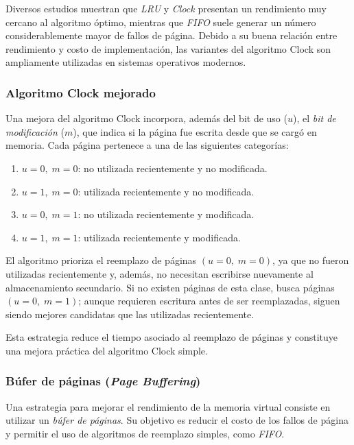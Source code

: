 Diversos estudios muestran que \textit{LRU} y \textit{Clock} presentan un rendimiento muy cercano al algoritmo óptimo, mientras que \textit{FIFO} suele generar un número considerablemente mayor de fallos de página. Debido a su buena relación entre rendimiento y costo de implementación, las variantes del algoritmo Clock son ampliamente utilizadas en sistemas operativos modernos.

\subsubsection{Algoritmo Clock mejorado}

Una mejora del algoritmo Clock incorpora, además del bit de uso (\(u\)), el \textit{bit de modificación} (\(m\)), que indica si la página fue escrita desde que se cargó en memoria. Cada página pertenece a una de las siguientes categorías:

\begin{enumerate}
  \item \(u=0,\; m=0\): no utilizada recientemente y no modificada.
  \item \(u=1,\; m=0\): utilizada recientemente y no modificada.
  \item \(u=0,\; m=1\): no utilizada recientemente y modificada.
  \item \(u=1,\; m=1\): utilizada recientemente y modificada.
\end{enumerate}

El algoritmo prioriza el reemplazo de páginas \((u=0,\; m=0)\), ya que no fueron utilizadas recientemente y, además, no necesitan escribirse nuevamente al almacenamiento secundario. Si no existen páginas de esta clase, busca páginas \((u=0,\; m=1)\); aunque requieren escritura antes de ser reemplazadas, siguen siendo mejores candidatas que las utilizadas recientemente.

Esta estrategia reduce el tiempo asociado al reemplazo de páginas y constituye una mejora práctica del algoritmo Clock simple.

\subsubsection{Búfer de páginas (\textit{Page Buffering})}

Una estrategia para mejorar el rendimiento de la memoria virtual consiste en utilizar un \textit{búfer de páginas}. Su objetivo es reducir el costo de los fallos de página y permitir el uso de algoritmos de reemplazo simples, como \textit{FIFO}.

